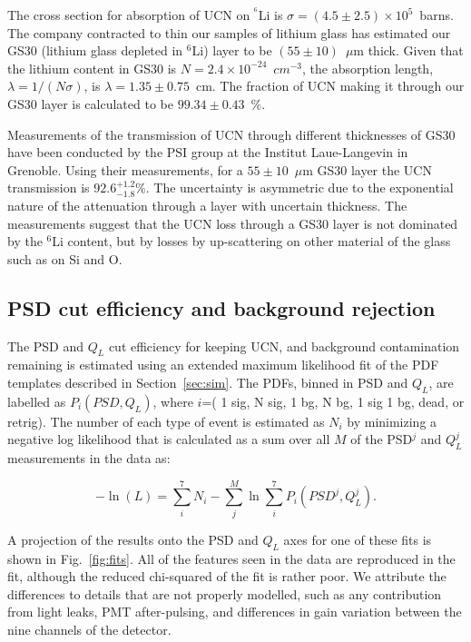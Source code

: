 \documentclass[letter,twocolumn,preprint,3p]{elsarticle}
\begin{document}
The cross section for absorption of UCN on $^{^6}$Li is $\sigma =
(4.5\pm2.5)\times10^{5}$~barns\cite{ban}.  The company contracted to
thin our samples of lithium glass has estimated our GS30 (lithium
glass depleted in $^6$Li) layer to be $(55\pm10)$~$\mu$m thick.  Given
that the lithium content in GS30 is $N = 2.4\times10^{-24}$~$cm^{-3}$,
the absorption length, $\lambda=1/(N\sigma)$, is
$\lambda=1.35\pm0.75$~cm.  The fraction of UCN making it through our
GS30 layer is calculated to be $99.34\pm0.43$~\%.

Measurements of the transmission of UCN through different thicknesses
of GS30 have been conducted by the PSI group at the Institut
Laue-Langevin in Grenoble\cite{Senoville}.  Using their measurements,
for a $55\pm10$~$\mu$m GS30 layer the UCN transmission is
$92.6^{+1.2}_{-1.8}$\%. The uncertainty is asymmetric due to the
exponential nature of the attenuation through a layer with uncertain
thickness.  The measurements suggest that the UCN loss through a GS30
layer is not dominated by the $^{6}$Li content, but by losses by
up-scattering on other material of the glass such as on Si and O.

\subsection{ PSD cut efficiency and background rejection}

The PSD and $Q_L$ cut efficiency for keeping UCN, and background
contamination remaining is estimated using an extended maximum
likelihood fit of the PDF templates described in
Section~\ref{sec:sim}.  The PDFs, binned in PSD and $Q_L$, are
labelled as $P_{i}( PSD, Q_L )$, where $i$=( 1 sig, N sig, 1 bg, N bg,
1 sig 1 bg, dead, or retrig).  The number of each type of event is
estimated as $N_i$ by minimizing a negative log likelihood that is
calculated as a sum over all $M$ of the PSD$^j$ and $Q_L^j$
measurements in the data as:

\begin{equation}
-\ln{(L)} = \sum_{i}^{7} N_i - \sum_{j}^{M} \ln{ \sum_{i}^{7} P_i( PSD^j, Q_L^j) }.
\end{equation}

A projection of the results onto the PSD and $Q_L$ axes for one of
these fits is shown in Fig.~\ref{fig:fits}.  All of the features seen
in the data are reproduced in the fit, although the reduced
chi-squared of the fit is rather poor.  We attribute the differences
to details that are not properly modelled, such as any contribution
from light leaks, PMT after-pulsing, and differences in gain variation
between the nine channels of the detector.
\end{document}
